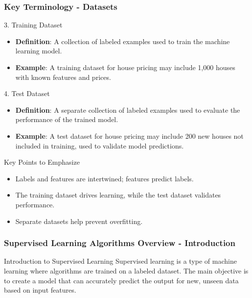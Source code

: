 \documentclass[aspectratio=169]{beamer}
\begin{document}
\begin{frame}[fragile]
    \frametitle{Key Terminology - Datasets}
    \begin{block}{3. Training Dataset}
        \begin{itemize}
            \item \textbf{Definition}: A collection of labeled examples used to train the machine learning model.
            \item \textbf{Example}: A training dataset for house pricing may include 1,000 houses with known features and prices.
        \end{itemize}
    \end{block}

    \begin{block}{4. Test Dataset}
        \begin{itemize}
            \item \textbf{Definition}: A separate collection of labeled examples used to evaluate the performance of the trained model.
            \item \textbf{Example}: A test dataset for house pricing may include 200 new houses not included in training, used to validate model predictions.
        \end{itemize}
    \end{block}

    \begin{block}{Key Points to Emphasize}
        \begin{itemize}
            \item Labels and features are intertwined; features predict labels.
            \item The training dataset drives learning, while the test dataset validates performance.
            \item Separate datasets help prevent overfitting.
        \end{itemize}
    \end{block}
\end{frame}

\begin{frame}[fragile]
    \frametitle{Supervised Learning Algorithms Overview - Introduction}
    \begin{block}{Introduction to Supervised Learning}
        Supervised learning is a type of machine learning where algorithms are trained on a labeled dataset. 
        The main objective is to create a model that can accurately predict the output for new, unseen data based on input features.
    \end{block}
\end{frame}
\end{document}
